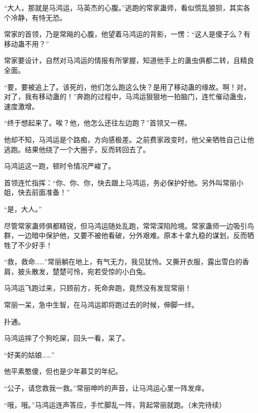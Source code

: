 \begin{this_body}
“大人，那就是马鸿运，马英杰的心腹。”逃跑的常家蛊师，看似慌乱狼狈，其实各个冷静，有恃无恐。

常家的首领，乃是常飚的心腹，他望着马鸿运的背影，一愣：“这人是傻子么？有移动蛊不用？”

常家要设计，自然对马鸿运的情报有所掌握，知道他手上的蛊虫俱都二转，且精良全面。

“要，要被追上了。该死的，他们怎么跑这么快？是用了移动蛊的缘故。啊！对，对了，我有移动蛊的！”奔跑的过程中，马鸿运狠狠地一拍脑门，连忙催动蛊虫，速度激增。

“终于想起来了。唉？他，他怎么还往左边跑？”首领又一楞。

他却不知，马鸿运是个路痴，方向感极差。之前费家政变时，他父亲牺牲自己让他逃跑。结果他绕了一个大圈子，反而转回去了。

马鸿运这一跑，顿时令情况严峻了。

首领连忙指挥：“你、你、你，快去跟上马鸿运，务必保护好他。另外叫常丽小姐，快去前面准备！”

“是，大人。”

尽管常家蛊师俱都精锐，但马鸿运随处乱跑，常常深陷险境。常家蛊师一边吸引鸟群，一边暗中保护他，又要不被他看破，分外艰难。原本十拿九稳的谋划，反而牺牲了不少好手！

“救，救命……”常丽躺在地上，有气无力，我见犹怜。又撕开衣服，露出雪白的香肩，披头散发，楚楚可怜，宛若受惊的小白兔。

马鸿运飞跑过来，只顾前方，死命奔跑，竟然没有发现常丽！

常丽一呆，急中生智，在马鸿运即将跑过去的时候，伸脚一绊。

扑通。

马鸿运摔了个狗吃屎，回头一看，呆了。

“好美的姑娘……”

他平素憨傻，但也是少年慕艾的年纪。

“公子，请您救我一救。”常丽呻吟的声音，让马鸿运心里一阵发痒。

“哦，哦。”马鸿运连声答应，手忙脚乱一阵，背起常丽就跑。（未完待续）

\end{this_body}


